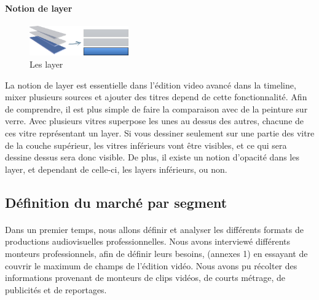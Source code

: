 \paragraph{}
\paragraph{Notion de layer}
  \begin{figure}
    \begin{center}
      \vspace{-20pt}
      \includegraphics[width=0.38\textwidth]{images/layers}
    \end{center}
    \vspace{-20pt}
    \caption{Les layer}
    \label{Yes}
  \end{figure}
La notion de layer est essentielle dans l'édition video avancé dans la
timeline, mixer plusieurs sources et ajouter des titres depend de cette
fonctionnalité. Afin de comprendre, il est plus simple de faire la comparaison
avec de la peinture sur verre. Avec plusieurs vitres superpose les unes au
dessus des autres, chacune de ces vitre représentant un layer. Si vous
dessiner seulement sur une partie des vitre de la couche supérieur, les vitres
inférieurs vont être visibles, et ce qui sera dessine dessus sera donc visible.
De plus, il existe un notion d'opacité dans les layer, et dependant de celle-ci,
les layers inférieurs, ou non.

\subsection{Définition du marché par segment}
\paragraph{}
Dans un premier temps, nous allons définir et analyser les
différents formats de productions audiovisuelles professionnelles.
Nous avons interviewé
différents monteurs professionnels, afin de définir leurs besoins,
(annexes 1) en essayant de
couvrir le maximum de champs de l'édition vidéo. Nous
avons pu récolter des informations provenant de monteurs de clips
vidéos, de courts métrage, de publicités et de reportages.

